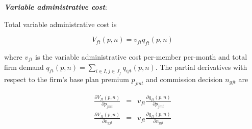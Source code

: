 \documentclass[12pt]{article}
\begin{document}
	
	

	
	
\noindent \textit{\bf Variable administrative cost}:
	
\noindent Total variable administrative cost is	
	
	\vspace{-0.3in}		
	
		$$
		V_{ft}(\textit{p},\textit{n}) = v_{ft} q_{ft}(\textit{p},\textit{n})
		$$	
	
		 
\noindent where $v_{ft}$ is the variable administrative cost per-member per-month and total firm demand $q_{ft}(\textit{p},\textit{n}) = \sum_{i \in I, j \in J_f} q_{ijt}(\textit{p},\textit{n})$.  The partial derivatives with respect to the firm's base plan premium $p_{jmt}$ and commission decision $n_{gjt}$ are 				 
		 
		\vspace{-0.4in}	

	\begin{eqnarray*}
	\frac{ \partial V_{ft}(\textit{p},\textit{n})}{\partial p_{jmt}} &=& v_{ft} \frac{\partial q_{ft}(\textit{p},\textit{n})}{\partial p_{jmt}} \\
	\frac{ \partial V_{ft}(\textit{p},\textit{n})}{\partial n_{gjt}} &=& v_{ft} \frac{\partial q_{ft}(\textit{p},\textit{n})}{\partial n_{gjt}}
	\end{eqnarray*}
\end{document}
